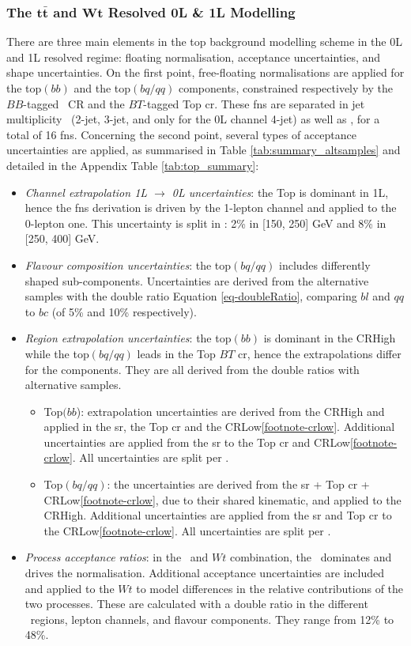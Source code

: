 \subsubsection{The $\boldsymbol{t\bar{t}}$ and $\boldsymbol{Wt}$ Resolved 0L \& 1L Modelling}
There are three main elements in the top background modelling scheme in the 0L and 1L resolved regime: floating normalisation, acceptance uncertainties, and shape uncertainties. On the first point, free-floating normalisations are applied for the top$(bb)$ and the top$(bq/qq)$ components, constrained respectively by the $BB$-tagged \highdr\ CR and the $BT$-tagged Top \gls{cr}. These \glspl{fn} are separated in jet multiplicity \nj\ (2-jet, 3-jet, and only for the 0L channel 4-jet) as well as \ptv, for a total of 16 \glspl{fn}. Concerning the second point, several types of acceptance uncertainties are applied, as summarised in Table \ref{tab:summary_altsamples} and detailed in the Appendix Table \ref{tab:top_summary}:
\begin{itemize}[leftmargin=*]
    \item \textit{Channel extrapolation 1L $\rightarrow$ 0L uncertainties}: the Top is dominant in 1L, hence the \glspl{fn} derivation is driven by the 1-lepton channel and applied to the 0-lepton one. This uncertainty is split in \ptv: 2\% in [150, 250] GeV and 8\% in [250, 400] GeV.
    \item \textit{Flavour composition uncertainties}: the top$(bq/qq)$ includes differently shaped sub-components. Uncertainties are derived from the alternative samples with the double ratio Equation \ref{eq-doubleRatio}, comparing $bl$ and $qq$ to $bc$ (of 5\% and 10\% respectively). 
    \item \textit{Region extrapolation uncertainties}: the top$(bb)$ is dominant in the CRHigh while the top$(bq/qq)$ leads in the Top $BT$ \gls{cr}, hence the extrapolations differ for the components. They are all derived from the double ratios with alternative samples.
    \begin{itemize}
        \item Top$(bb$): extrapolation uncertainties are derived from the CRHigh and applied in the \gls{sr}, the Top \gls{cr} and the CRLow\cref{footnote-crlow}. Additional uncertainties are applied from the \gls{sr} to the Top \gls{cr} and CRLow\cref{footnote-crlow}. All uncertainties are split per \ptv.
        \item Top$(bq/qq)$: the uncertainties are derived from the \gls{sr} + Top \gls{cr} + CRLow\cref{footnote-crlow}, due to their shared kinematic, and applied to the CRHigh. Additional uncertainties are applied from the \gls{sr} and Top \gls{cr} to the CRLow\cref{footnote-crlow}. All uncertainties are split per \ptv.
    \end{itemize}
    \item \textit{Process acceptance ratios}: in the \ttb\ and $Wt$ combination, the \ttb\ dominates and drives the normalisation. Additional acceptance uncertainties are included and applied to the $Wt$ to model differences in the relative contributions of the two processes. These are calculated with a double ratio in the different \ptv\ regions, lepton channels, and flavour components. They range from 12\% to 48\%.
\end{itemize}
